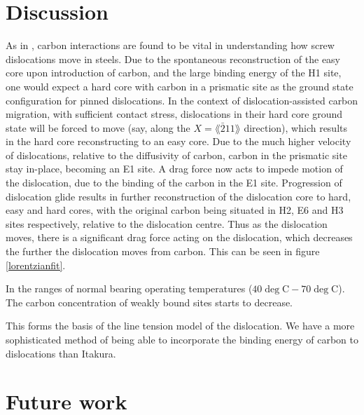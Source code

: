 \documentclass[a4paper,11pt]{article}
\begin{document}
\section{Discussion}
\label{sec:orgdd5a64f}


As in \cite{Lthi2019}, carbon interactions are found to be vital in understanding how screw
dislocations move in steels. Due to the spontaneous reconstruction of the easy core upon
introduction of carbon, and the large binding energy of the H1 site, one would expect a hard
core with carbon in a prismatic site as the ground state configuration for pinned
dislocations. In the context of dislocation-assisted carbon migration, with sufficient contact
stress, dislocations in their hard core ground state will be forced to move (say, along the \(X =
    \lang\bar{2}11\rang\) direction), which results in the hard core reconstructing to an easy core. Due to
the much higher velocity of dislocations, relative to the diffusivity of carbon, carbon in the
prismatic site stay in-place, becoming an E1 site. A drag force now acts to impede motion of the
dislocation, due to the binding of the carbon in the E1 site. Progression of dislocation glide
results in further reconstruction of the dislocation core to hard, easy and hard cores, with the
original carbon being situated in H2, E6 and H3 sites respectively, relative to the dislocation
centre. Thus as the dislocation moves, there is a significant drag force acting on the
dislocation, which decreases the further the dislocation moves from carbon. This can be seen in
figure \ref{lorentzianfit}.

In the ranges of normal bearing operating temperatures (\(40\deg\text{C} - 70\deg\text{C}\)). The carbon
concentration of weakly bound sites starts to decrease.  



This forms the basis of the line tension model of the dislocation. We have a more sophisticated
method of being able to incorporate the binding energy of carbon to dislocations than Itakura. 



\section{Future work}
\label{sec:orgf94b352}
\end{document}
